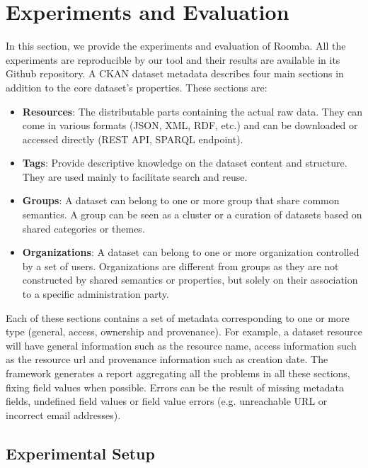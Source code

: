 
\section{Experiments and Evaluation}
\label{section:roomba_experiment}
In this section, we provide the experiments and evaluation of Roomba. All the experiments are reproducible by our tool and their results are available in its Github repository. A CKAN dataset metadata describes four main sections in addition to the core dataset's properties. These sections are:
\begin{itemize}
  \item \textbf{Resources}: The distributable parts containing the actual raw data. They can come in various formats (JSON, XML, RDF, etc.) and can be downloaded or accessed directly (REST API, SPARQL endpoint).
  \item \textbf{Tags}: Provide descriptive knowledge on the dataset content and structure. They are used mainly to facilitate search and reuse.
  \item \textbf{Groups}: A dataset can belong to one or more group that share common semantics. A group can be seen as a cluster or a curation of datasets based on shared categories or themes.
  \item \textbf{Organizations}: A dataset can belong to one or more organization controlled by a set of users. Organizations are different from groups as they are not constructed by shared semantics or properties, but solely on their association to a specific administration party.
\end{itemize}

Each of these sections contains a set of metadata corresponding to one or more type (general, access, ownership and provenance). For example, a dataset resource will have general information such as the resource name, access information such as the resource url and provenance information such as creation date. The framework generates a report aggregating all the problems in all these sections, fixing field values when possible. Errors can be the result of missing metadata fields, undefined field values or field value errors (e.g. unreachable URL or incorrect email addresses).

\subsection{Experimental Setup}

